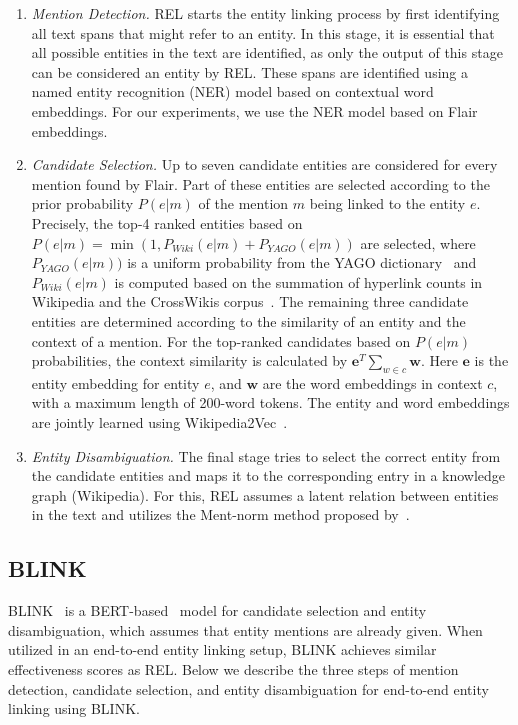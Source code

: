 \begin{enumerate}
	\item \emph{Mention Detection.} REL starts the entity linking process by first identifying all text spans that might refer to an entity. In this stage, it is essential that all possible entities in the text are identified, as only the output of this stage can be considered an entity by REL. These spans are identified using a named entity recognition (NER) model based on contextual word embeddings. For our experiments, we use the NER model based on Flair embeddings. 
	\item \emph{Candidate Selection.} Up to seven candidate entities are considered for every mention found by Flair. Part of these entities are selected according to the prior probability $P(e|m)$ of the mention $m$ being linked to the entity $e$. Precisely, the top-4 ranked entities based on $P(e|m) = \min(1, P_{\mathit{Wiki}}(e|m) + P_{\mathit{YAGO}}(e|m))$ are selected, where $P_{\mathit{YAGO}}(e|m))$ is a uniform probability from the YAGO dictionary~\citep{yago} and $P_{\mathit{Wiki}}(e|m)$ is computed based on the summation of hyperlink counts in Wikipedia and the CrossWikis corpus~\citep{crosswiki}.
	The remaining three candidate entities are determined according to the similarity of an entity and the context of a mention. For the top-ranked candidates based on $P(e|m)$ probabilities, the context similarity is calculated by $\mathbf{e}^T \sum_{w\in c}\mathbf{w}$. Here $\mathbf{e}$ is the entity embedding for entity $e$, and $\mathbf{w}$ are the word embeddings in context $c$, with a maximum length of 200-word tokens. The entity and word embeddings are jointly learned using Wikipedia2Vec~\citep{wikipedia2vec}. 
	\item \emph{Entity Disambiguation.} The final stage tries to select the correct entity from the candidate entities and maps it to the corresponding entry in a knowledge graph (Wikipedia). For this, REL assumes a latent relation between entities in the text and utilizes the Ment-norm method proposed by~\citet{ED-paper}.
\end{enumerate}

\subsection{BLINK}
BLINK~\citep{blink} is a BERT-based~\citep{BERT} model for candidate selection and entity disambiguation, which assumes that entity mentions are already given. When utilized in an end-to-end entity linking setup, BLINK achieves similar effectiveness scores as REL. Below we describe the three steps of mention detection, candidate selection, and entity disambiguation for end-to-end entity linking using BLINK.

